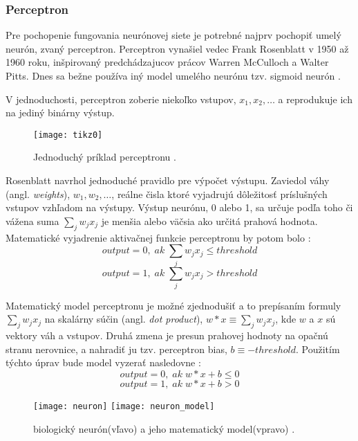 \subsubsection{Perceptron}
Pre pochopenie fungovania neurónovej siete je potrebné najprv pochopiť umelý neurón, zvaný perceptron.
Perceptron vynašiel vedec Frank Rosenblatt v 1950 až 1960 roku, inšpirovaný predchádzajucov prácov Warren McCulloch a Walter Pitts.
Dnes sa bežne používa iný model umelého neurónu tzv. sigmoid neurón \cite{odkaz:HandwrittenDigitRecognision}.

V jednoduchosti, perceptron zoberie niekoľko vstupov, $x_1, x_2, \dots$ a reprodukuje ich na jediný binárny výstup.
\begin{figure}[H]
	\centering
	\texttt{[image: tikz0]}
	\caption{Jednoduchý príklad perceptronu \cite{odkaz:HandwrittenDigitRecognision}.}
	\label{pic:Perceptron}
\end{figure}
Rosenblatt navrhol jednoduché pravidlo pre výpočet výstupu.
Zaviedol váhy (angl. \textit{weights}), $w_1, w_2, \dots$,
    reálne čisla ktoré vyjadrujú dôležitosť príslušných vstupov vzhľadom na výstupy.
Výstup neurónu, 0 alebo 1, sa určuje podľa toho či vážena suma $\sum_j w_j x_j$ je menšia alebo väčsia ako určitá prahová hodnota.
Matematické vyjadrenie aktivačnej funkcie perceptronu by potom bolo \cite{odkaz:HandwrittenDigitRecognision}:
\begin{equation}
    output = 0, \; ak \; \sum_j w_j x_j \leq threshold
\end{equation}
\begin{equation}
    output = 1, \; ak \; \sum_j w_j x_j > threshold
\end{equation}

Matematický model perceptronu je možné zjednodušiť a to prepísaním formuly $\sum_j w_j x_j$ na skalárny súčin (angl. \textit{dot product}),
    $w*x \equiv \sum_j w_j x_j$, kde $w$ a $x$ sú vektory váh a vstupov.
Druhá zmena je presun prahovej hodnoty na opačnú stranu nerovnice, a nahradiť ju tzv. perceptron bias, $b \equiv -threshold$.
Použitím týchto úprav bude model vyzerať nasledovne \cite{odkaz:HandwrittenDigitRecognision}:
\begin{equation}
    output = 0, \; ak \; w*x + b \leq 0
\end{equation}
\begin{equation}
    output = 1, \; ak \; w*x + b > 0
\end{equation}

\begin{figure}[H]
    \centering
    \texttt{[image: neuron]}
    \qquad
    \texttt{[image: neuron\_model]}
    \caption{biologický neurón(vľavo) a jeho matematický model(vpravo) \cite{odkaz:ConvolutionalNeuralNetworkCS231n}.}
    \label{pic:Neuron}
\end{figure}

